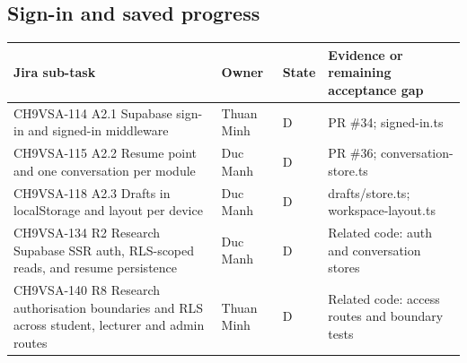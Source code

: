 \documentclass[11pt,a4paper]{article}
\begin{document}
\subsection{Sign-in and saved progress}
{\small
\begin{longtable}{>{\raggedright\arraybackslash}p{}>{\raggedright\arraybackslash}p{}>{\raggedright\arraybackslash}p{}>{\raggedright\arraybackslash}p{}}
\toprule
\textbf{Jira sub-task} & \textbf{Owner} & \textbf{State} & \textbf{Evidence or remaining acceptance gap} \\
\midrule
\endhead
CH9VSA-114 \newline A2.1 Supabase sign-in and signed-in middleware & Thuan Minh & D & PR \#34; signed-in.ts \\
CH9VSA-115 \newline A2.2 Resume point and one conversation per module & Duc Manh & D & PR \#36; conversation-store.ts \\
CH9VSA-118 \newline A2.3 Drafts in localStorage and layout per device & Duc Manh & D & drafts/store.ts; workspace-layout.ts \\
CH9VSA-134 \newline R2 Research Supabase SSR auth, RLS-scoped reads, and resume persistence & Duc Manh & D & Related code: auth and conversation stores \\
CH9VSA-140 \newline R8 Research authorisation boundaries and RLS across student, lecturer and admin routes & Thuan Minh & D & Related code: access routes and boundary tests \\
\bottomrule
\end{longtable}}
\end{document}
